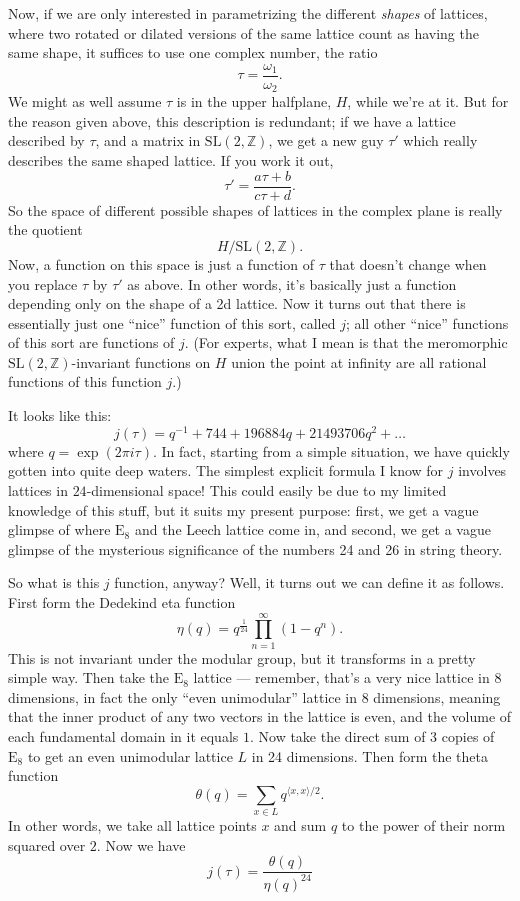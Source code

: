 \documentclass{article}
\begin{document}
Now, if we are only interested in parametrizing the different
\emph{shapes} of lattices, where two rotated or dilated versions of the
same lattice count as having the same shape, it suffices to use one
complex number, the ratio \[\tau=\frac{\omega_1}{\omega_2}.\] We might
as well assume \(\tau\) is in the upper halfplane, \(H\), while we're at
it. But for the reason given above, this description is redundant; if we
have a lattice described by \(\tau\), and a matrix in
\(\mathrm{SL}(2,\mathbb{Z})\), we get a new guy \(\tau'\) which really
describes the same shaped lattice. If you work it out,
\[\tau' = \frac{a\tau + b}{c\tau + d}.\] So the space of different
possible shapes of lattices in the complex plane is really the quotient
\[H/\mathrm{SL}(2,\mathbb{Z}).\] Now, a function on this space is just a
function of \(\tau\) that doesn't change when you replace \(\tau\) by
\(\tau'\) as above. In other words, it's basically just a function
depending only on the shape of a 2d lattice. Now it turns out that there
is essentially just one ``nice'' function of this sort, called \(j\);
all other ``nice'' functions of this sort are functions of \(j\). (For
experts, what I mean is that the meromorphic
\(\mathrm{SL}(2,\mathbb{Z})\)-invariant functions on \(H\) union the
point at infinity are all rational functions of this function \(j\).)

It looks like this:
\[j(\tau) = q^{-1} + 744 + 196884 q + 21493706 q^2 + \ldots\] where
\(q = \exp(2\pi i\tau)\). In fact, starting from a simple situation, we
have quickly gotten into quite deep waters. The simplest explicit
formula I know for \(j\) involves lattices in \(24\)-dimensional space!
This could easily be due to my limited knowledge of this stuff, but it
suits my present purpose: first, we get a vague glimpse of where
\(\mathrm{E}_8\) and the Leech lattice come in, and second, we get a
vague glimpse of the mysterious significance of the numbers 24 and 26 in
string theory.

So what is this \(j\) function, anyway? Well, it turns out we can define
it as follows. First form the Dedekind eta function
\[\eta(q) = q^{\frac{1}{24}}\prod_{n=1}^\infty(1-q^n).\] This is not
invariant under the modular group, but it transforms in a pretty simple
way. Then take the \(\mathrm{E}_8\) lattice --- remember, that's a very
nice lattice in 8 dimensions, in fact the only ``even unimodular''
lattice in 8 dimensions, meaning that the inner product of any two
vectors in the lattice is even, and the volume of each fundamental
domain in it equals \(1\). Now take the direct sum of 3 copies of
\(\mathrm{E}_8\) to get an even unimodular lattice \(L\) in 24
dimensions. Then form the theta function
\[\theta(q) = \sum_{x\in L}q^{\langle x,x\rangle/2}.\] In other words,
we take all lattice points \(x\) and sum \(q\) to the power of their
norm squared over \(2\). Now we have
\[j(\tau) = \frac{\theta(q)}{\eta(q)^24}\]
\end{document}
